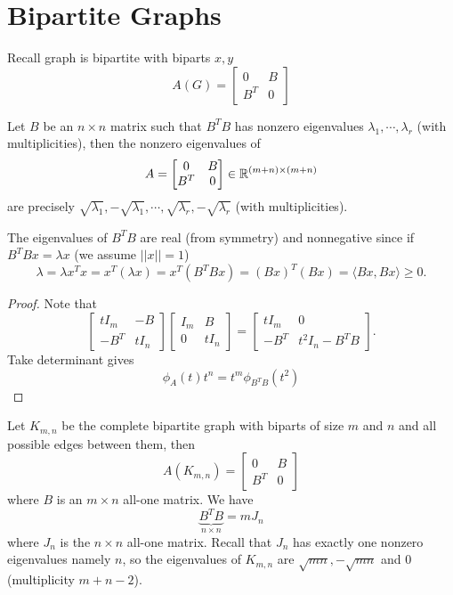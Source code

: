 \section{Bipartite Graphs}
Recall graph is bipartite with biparts \(x,y\) \iff
\[ A(G)=\begin{bmatrix}0 & B \\ B^T & 0\end{bmatrix} \]

\begin{lemma}
Let \(B\) be an \(n\times n\) matrix such that \(B^TB\) has nonzero eigenvalues \(\lambda_1,\cdots,\lambda_r\) (with multiplicities), then the nonzero eigenvalues of 
\[ A=\begin{bmatrix}0 & B \\ B^T & 0\end{bmatrix}\in\mathbb{R}^{(m+n)\times(m+n)} \]
are precisely \( \sqrt{\lambda_1},-\sqrt{\lambda_1},\cdots,\sqrt{\lambda_r},-\sqrt{\lambda_r} \) (with multiplicities).
\end{lemma}
\begin{remark}
The eigenvalues of \(B^TB\) are real (from symmetry) and nonnegative since if \(B^T Bx=\lambda x\) (we assume \(||x||=1\))
\[ \lambda =\lambda x^T x= x^T (\lambda x)= x^T(B^T Bx) =(Bx)^T(Bx)=\langle Bx,Bx\rangle\geq0. \]
\end{remark}
\begin{proof}
Note that
\[ \begin{bmatrix}t I_m & -B \\ -B^T & t I_n\end{bmatrix}\begin{bmatrix} I_m & B \\ 0 & t I_n\end{bmatrix}=\begin{bmatrix}t I_m & 0 \\ -B^T & t^2 I_n-B^TB \end{bmatrix}. \]
Take determinant gives
\[ \phi_A(t) t^n=t^m\phi_{B^TB}(t^2) \]
\end{proof}

\begin{example}
Let \(K_{m,n}\) be the complete bipartite graph with biparts of size \(m\) and \(n\) and all possible edges between them, then
\[ A(K_{m,n})=\begin{bmatrix}0 & B \\ B^T & 0\end{bmatrix} \]
where \(B\) is an \(m\times n\) all-one matrix. We have
\[ \underbrace{B^T B}_{n\times n} = m J_n \]
where \(J_n\) is the \(n\times n\) all-one matrix.
Recall that \(J_n\) has exactly one nonzero eigenvalues namely \(n\), so the eigenvalues of \(K_{m,n}\) are \(\sqrt{mn},-\sqrt{mn}\) and 0 (multiplicity \(m+n-2\)).
\end{example}

